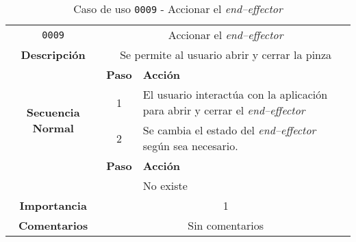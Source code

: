 \begin{table}[H]
    \centering
    \begin{tabularx}{\textwidth}{|c|c|X|}
        \cline{1-3}
        \texttt{0009}        & \multicolumn{2}{c|}{Accionar el \textit{end--effector}}                                      
        \\ \cline{1-3}
        \textbf{Descripción} & \multicolumn{2}{m{13cm}|}{Se permite al usuario abrir y cerrar la pinza}
        \\ \cline{1-3}
        \multirow{4}{*}{\textbf{Secuencia Normal}} & \textbf{Paso} & \textbf{Acción}
        \\ \cline{2-3}                    &   1  & El usuario interactúa con la aplicación para abrir y cerrar el \textit{end--effector}
        \\ \cline{2-3}                    &   2  & Se cambia el estado del \textit{end--effector} según sea necesario. 
        \\ \cline{1-3}
        \multirow{2}{*}{\textbf{Excepciones}} & \textbf{Paso} & \textbf{Acción}
        \\ \cline{2-3}                    &      &  No existe
        \\ \cline{1-3}
        \textbf{Importancia}                 & \multicolumn{2}{c|}{1}           
        \\ \cline{1-3}
        \textbf{Comentarios}                 & \multicolumn{2}{c|}{Sin comentarios}
        \\ \cline{1-3}
    \end{tabularx}
    \caption{Caso de uso \texttt{0009} - Accionar el \textit{end--effector}}
    \label{tab:CU0009}
    \label{tab:caso_de_uso_accionar_end_effector}
\end{table}

